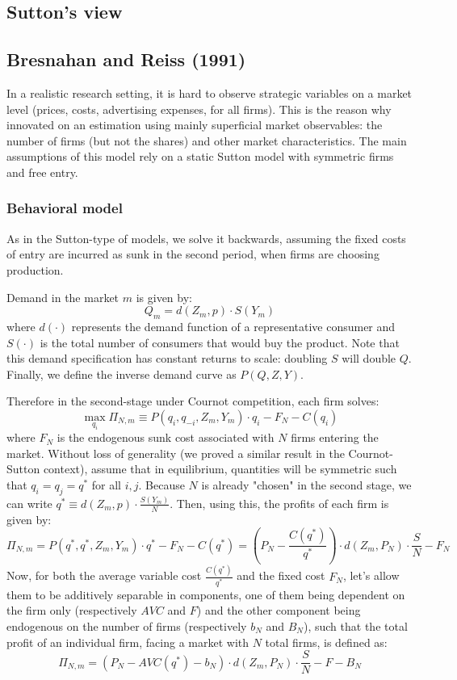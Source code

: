 \subsection{Sutton's view}



\subsection{Bresnahan and Reiss (1991)}

In a realistic research setting, it is hard to observe strategic variables on a market level (prices, costs, advertising expenses, for all firms). This is the reason why \cite{br_91} innovated on an estimation using mainly superficial market observables: the number of firms (but not the shares) and other market characteristics. The main assumptions of this model rely on a static Sutton model with symmetric firms and free entry.

\subsubsection{Behavioral model}

As in the Sutton-type of models, we solve it backwards, assuming the fixed costs of entry are incurred as sunk in the second period, when firms are choosing production.

Demand in the market $m$ is given by: $$ Q_m = d(Z_m, p)\cdot S(Y_m) $$ where $d(\cdot)$ represents the demand function of a representative consumer and $S(\cdot)$ is the total number of consumers that would buy the product. Note that this demand specification has constant returns to scale: doubling $S$ will double $Q$. Finally, we define the inverse demand curve as $P(Q, Z, Y)$.

Therefore in the second-stage under Cournot competition, each firm solves: $$\max_{q_i}\Pi_{N,m} \equiv P(q_i, q_{-i}, Z_m, Y_m) \cdot q_i - F_N - C(q_i) $$ where $F_N$ is the endogenous sunk cost associated with $N$ firms entering the market. Without loss of generality (we proved a similar result in the Cournot-Sutton context), assume that in equilibrium, quantities will be symmetric such that $q_i = q_j = q^*$ for all $i,j$. Because $N$ is already "chosen" in the second stage, we can write $q^* \equiv d(Z_m, p)\cdot \frac{S(Y_m)}{N}$. Then, using this, the profits of each firm is given by: $$\Pi_{N,m} = P(q^*, q^*, Z_m, Y_m) \cdot q^* - F_N - C(q^*) = \left(P_N - \frac{C(q^*)}{q^*} \right) \cdot d(Z_m, P_N)\cdot \frac{S}{N} - F_N $$ Now, for both the average variable cost $\frac{C(q^*)}{q^*}$ and the fixed cost $F_N$, let's allow them to be additively separable in components, one of them being dependent on the firm only (respectively $AVC$ and $F$) and the other component being endogenous on the number of firms (respectively $b_N$ and $B_N$), such that the total profit of an individual firm, facing a market with $N$ total firms, is defined as: $$\Pi_{N,m} = \left(P_N - AVC(q^*) - b_N \right) \cdot d(Z_m, P_N)\cdot \frac{S}{N} - F - B_N $$


